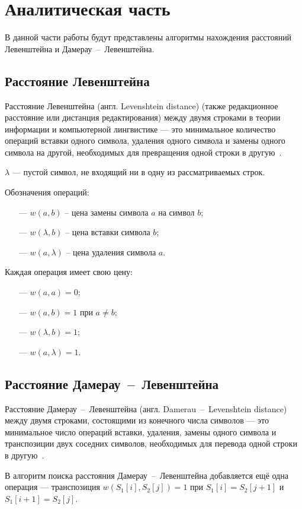 \chapter{Аналитическая часть}

В данной части работы будут представлены алгоритмы нахождения расстояний Левенштейна и Дамерау~--~Левенштейна.

\section{Расстояние Левенштейна}

Расстояние Левенштейна (англ. Levenshtein distance) (также редакционное расстояние или дистанция редактирования) между двумя строками в теории информации и компьютерной лингвистике --- это минимальное количество операций вставки одного символа, удаления одного символа и замены одного символа на другой, необходимых для превращения одной строки в другую~\cite{lev}.

$\lambda$ --- пустой символ, не входящий ни в одну из рассматриваемых строк.

Обозначения операций:
\begin{itemize}
	\item[---] $w(a, b)$ -- цена замены символа $a$ на символ $b$;
	\item[---] $w(\lambda, b)$ -- цена вставки символа $b$;
	\item[---] $w(a, \lambda)$ -- цена удаления символа $a$.
\end{itemize}

Каждая операция имеет свою цену:
\begin{itemize}
	\item[---] $w(a, a) = 0$;
	\item[---] $w(a, b) = 1$ при $a \neq b$;
	\item[---] $w(\lambda, b) = 1$;
	\item[---] $w(a, \lambda) = 1$.
\end{itemize}

\section{Расстояние Дамерау~--~Левенштейна}

Расстояние Дамерау~--~Левенштейна (англ. Damerau~--~Levenshtein distance) между двумя строками, состоящими из конечного числа символов --- это минимальное число операций вставки, удаления, замены одного символа и транспозиции двух соседних символов, необходимых для перевода одной строки в другую~\cite{damerau_levenstein}.

В алгоритм поиска расстояния Дамерау~--~Левенштейна добавляется ещё одна операция --- транспозиция $w(S_{1}[i], S_{2}[j]) = 1$ при $S_{1}[i] = S_{2}[j + 1]$ и $S_{1}[i + 1] = S_{2}[j]$.



